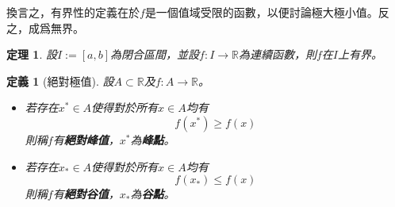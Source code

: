 \documentclass[12pt]{article}
\newtheorem{definition}{定義}
\newtheorem*{theorem}{定理}
\begin{document}
    換言之，有界性的定義在於$f$是一個值域受限的函數，以便討論極大極小值。反之，成爲無界。

    \begin{theorem}
        設$I:=[a,b]$為閉合區間，並設$f:I\to\mathbb{R}$為連續函數，則$f$在$I$上有界。
    \end{theorem}

    \begin{definition}[絕對極值]
        設$A\subset \mathbb{R}$及$f:A\to\mathbb{R}$。\begin{itemize}
            \item 若存在$x^*\in A$使得對於所有$x\in A$均有$$f(x^*)\geq f(x)$$則稱$f$有\textbf{絕對峰值}，$x^*$為\textbf{峰點}。
            \item 若存在$x_*\in A$使得對於所有$x\in A$均有$$f(x_*)\leq f(x)$$則稱$f$有\textbf{絕對谷值}，$x_*$為\textbf{谷點}。
        \end{itemize}
    \end{definition}
\end{document}
